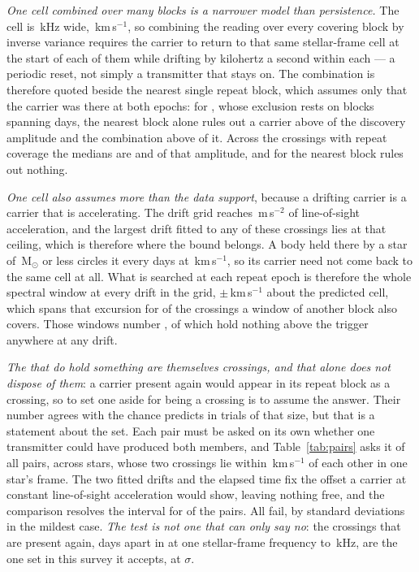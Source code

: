 \emph{One cell combined over many blocks is a narrower model than
persistence.} The cell is \TjChanKHz\,kHz wide, \TjChanKms\,km\,s$^{-1}$, so
combining the reading over every covering block by inverse variance requires
the carrier to return to that same stellar-frame cell at the start of each of
them while drifting by kilohertz a second within each --- a periodic reset,
not simply a transmitter that stays on. The combination is therefore quoted
beside the nearest single repeat block, which assumes only that the carrier
was there at both epochs: for \TjDeepStar, whose exclusion rests on
\TjDeepNRep{} blocks spanning \TjDeepSpanD{} days, the nearest block alone
rules out a carrier above \TjDeepFracNear{} of the discovery amplitude and the
combination above \TjDeepFracComb{} of it. Across the \TjCombNCross{} crossings
with repeat coverage the medians are \TjFracNearMed{} and \TjFracCombMed{} of
that amplitude, and for \TjNNearWeak{} the nearest block rules out nothing.

\emph{One cell also assumes more than the data support}, because a drifting
carrier is a carrier that is accelerating. The drift grid reaches
\WdAGrid\,m\,s$^{-2}$ of line-of-sight acceleration, and the largest drift
fitted to any of these crossings lies at that ceiling, which is therefore
where the bound belongs. A body held there by a star of \WdMassMax\,M$_\odot$
or less circles it every \TjPorbD{} days at \WdOrbKms\,km\,s$^{-1}$, so its
carrier need not come back to the same cell at all. What is searched at each
repeat epoch is therefore the whole spectral window at every drift in the
grid, $\pm$\WdHalfKms\,km\,s$^{-1}$ about the predicted cell, which spans that
excursion for \WdNOrbSpan{} of the \WdNOrbTot{} crossings a window of
another block also covers. Those windows number \WdNCov, of which \WdNEmpty{}
hold nothing above the trigger anywhere at any drift.

\emph{The \WdNExc{} that do hold something are themselves crossings, and that
alone does not dispose of them}: a carrier present again would appear in its
repeat block as a crossing, so to set one aside for being a crossing is to
assume the answer. Their number agrees with the \WdExpect{} chance predicts in
trials of that size, but that is a statement about the set. Each pair must be
asked on its own whether one transmitter could have produced both members, and
Table~\ref{tab:pairs} asks it of all \TjNPair{} pairs, across
\TjNStarPair{} stars, whose two crossings lie within
\WdHalfKms\,km\,s$^{-1}$ of each other in one star's frame. The two fitted
drifts and the elapsed time fix the offset a carrier at constant
line-of-sight acceleration would show, leaving nothing free, and the
comparison resolves the interval for \TjNPower{} of the \TjNPair{} pairs. All
\TjNPower{} fail, by \TjSigMin{} standard deviations in the mildest case.
\emph{The test is not one that can only say no}: the \TjCtlStar{} crossings
that are present again, \TjCtlDtD{} days apart in \TjCtlLine{} at one
stellar-frame frequency to \TjCtlOffKHz\,kHz, are the one set in this survey
it accepts, at \TjCtlNSig$\sigma$.

